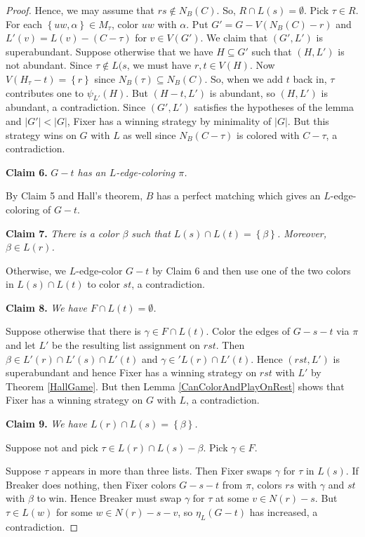 \documentclass[12pt,reqno]{amsart}
\theoremstyle{plain}
\theoremstyle{definition}
\theoremstyle{remark}
\newcommand{\set}[1]{\left\{ #1 \right\}}
\newcommand{\card}[1]{\left|#1\right|}
\begin{document}
\begin{proof}
Hence, we may assume that $rs \not \in N_B(C)$. So, $R \cap L(s) = \emptyset$. Pick $\tau \in R$. For each $\set{uw, \alpha} \in M_\tau$, color $uw$ with $\alpha$.  Put $G' = G - V(N_B(C) - r)$ and $L'(v) = L(v) - (C - \tau)$ for $v \in V(G')$.  We claim that $(G', L')$ is superabundant.  Suppose otherwise that we have $H \subseteq G'$ such that $(H, L')$ is not abundant. Since $\tau \not \in L(s$, we must have $r, t \in V(H)$.  Now $V(H_\tau - t) = \set{r}$ since $N_B(\tau) \subseteq N_B(C)$.  So, when we add $t$ back in, $\tau$ contributes one to $\psi_{L'}(H)$.  But $(H - t, L')$ is abundant, so $(H, L')$ is abundant, a contradiction.  Since $(G', L')$ satisfies the hypotheses of the lemma and $\card{G'} < \card{G}$, Fixer has a winning strategy by minimality of $\card{G}$. But this strategy wins on $G$ with $L$ as well since $N_B(C - \tau)$ is colored with $C - \tau$, a contradiction. 

\noindent\textbf{Claim 6.  }\textit{$G-t$ has an $L$-edge-coloring $\pi$.}

By Claim 5 and Hall's theorem, $B$ has a perfect matching which gives an $L$-edge-coloring of $G-t$.

\noindent\textbf{Claim 7.  }\textit{There is a color $\beta$ such that $L(s) \cap L(t) = \set{\beta}$.  Moreover, $\beta \in L(r)$.}

Otherwise, we $L$-edge-color $G-t$ by Claim 6 and then use one of the two colors in $L(s) \cap L(t)$ to color $st$, a contradiction.

\noindent\textbf{Claim 8.  }\textit{We have $F \cap L(t) = \emptyset$.}

Suppose otherwise that there is $\gamma \in F \cap L(t)$.  Color the edges of $G - s - t$ via $\pi$ and let $L'$ be the resulting list assignment on $rst$.  Then $\beta \in L'(r) \cap L'(s) \cap L'(t)$ and $\gamma \in 'L(r) \cap L'(t)$.  Hence $(rst, L')$ is superabundant and hence Fixer has a winning strategy on $rst$ with $L'$ by Theorem \ref{HallGame}.  But then Lemma \ref{CanColorAndPlayOnRest} shows that Fixer has a winning strategy on $G$ with $L$, a contradiction.

\noindent\textbf{Claim 9.  }\textit{We have $L(r) \cap L(s) = \set{\beta}$.}

Suppose not and pick $\tau \in L(r) \cap L(s) - \beta$. Pick $\gamma \in F$. 

Suppose $\tau$ appears in more than three lists.  Then Fixer swaps $\gamma$ for $\tau$ in $L(s)$.  If Breaker does nothing, then Fixer colors $G - s - t$ from $\pi$, colors $rs$ with $\gamma$ and $st$ with $\beta$ to win.  Hence Breaker must swap $\gamma$ for $\tau$ at some $v \in N(r) - s$.  But $\tau \in L(w)$ for some $w \in N(r) - s - v$, so $\eta_L(G-t)$ has increased, a contradiction. 


\end{proof}
\end{document}
